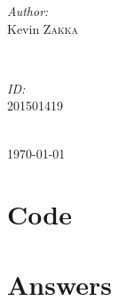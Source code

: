 \documentclass[12pt]{article}
\begin{document}
\begin{titlepage}
\begin{minipage}{0.4\textwidth}
\begin{flushleft} \large
\emph{Author:}\\
Kevin \textsc{Zakka} 
\end{flushleft}
\end{minipage}
~
\begin{minipage}{0.4\textwidth}
\begin{flushright} \large
\emph{ID:} \\
201501419
\end{flushright}
\end{minipage}\\[2cm]

{\large \today}\\[2cm]
 

\vfill %

\end{titlepage}

\section{Code}

\section{Answers}
\end{document}
